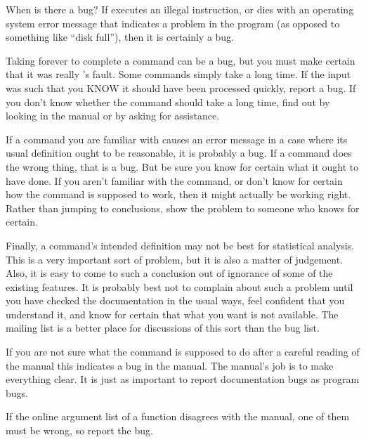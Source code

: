 \begin{Section}{When is there a bug?}
If \R{} executes an illegal instruction, or dies with an operating
system error message that indicates a problem in the program (as
opposed to something like ``disk full''), then it is certainly a
bug.

Taking forever to complete a command can be a bug, but you must make
certain that it was really \R{}'s fault.  Some commands simply take a
long time.  If the input was such that you KNOW it should have been
processed quickly, report a bug.  If you don't know whether the
command should take a long time, find out by looking in the manual or
by asking for assistance.

If a command you are familiar with causes an \R{} error message in a
case where its usual definition ought to be reasonable, it is probably
a bug.  If a command does the wrong thing, that is a bug.  But be sure
you know for certain what it ought to have done.  If you aren't
familiar with the command, or don't know for certain how the command
is supposed to work, then it might actually be working right.  Rather
than jumping to conclusions, show the problem to someone who knows for
certain.

Finally, a command's intended definition may not be best for
statistical analysis.  This is a very important sort of problem, but
it is also a matter of judgement.  Also, it is easy to come to such a
conclusion out of ignorance of some of the existing features.  It is
probably best not to complain about such a problem until you have
checked the documentation in the usual ways, feel confident that you
understand it, and know for certain that what you want is not
available. The mailing list  is a better
place for discussions of this sort than the bug list.

If you are not sure what the command is supposed to do
after a careful reading of the manual this indicates a bug in the
manual.  The manual's job is to make everything clear.  It is just as
important to report documentation bugs as program bugs.

If the online argument list of a function disagrees with the manual,
one of them must be wrong, so report the bug.
\end{Section}
%
